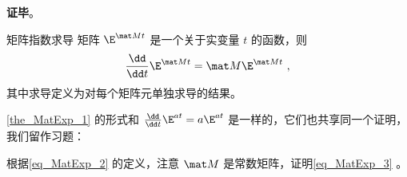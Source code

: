 \textbf{证毕}。





\begin{theorem}{矩阵指数求导}\label{the_MatExp_1}
矩阵 $\E^{\mat Mt}$ 是一个关于实变量 $t$ 的函数，则
\begin{equation}\label{eq_MatExp_3}
\frac{\dd}{\dd t}\E^{\mat Mt}=\mat M\E^{\mat Mt}~,
\end{equation}
其中求导定义为对每个矩阵元单独求导的结果。
\end{theorem}

\autoref{the_MatExp_1} 的形式和 $\frac{\dd}{\dd t}\E^{at}=a\E^{at}$ 是一样的，它们也共享同一个证明，我们留作习题：

\begin{exercise}{}
根据\autoref{eq_MatExp_2} 的定义，注意 $\mat M$ 是常数矩阵，证明\autoref{eq_MatExp_3} 。
\end{exercise}









